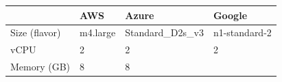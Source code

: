 \begin{tabular}[]{@{}llll@{}}
\toprule
\begin{minipage}[b]{0.13\columnwidth}\raggedright
\strut
\end{minipage} & \begin{minipage}[b]{0.17\columnwidth}\raggedright
AWS\strut
\end{minipage} & \begin{minipage}[b]{0.47\columnwidth}\raggedright
Azure\strut
\end{minipage} & \begin{minipage}[b]{0.12\columnwidth}\raggedright
Google\strut
\end{minipage}\tabularnewline
\midrule
\begin{minipage}[t]{0.13\columnwidth}\raggedright
Size (flavor)\strut
\end{minipage} & \begin{minipage}[t]{0.17\columnwidth}\raggedright
m4.large\strut
\end{minipage} & \begin{minipage}[t]{0.47\columnwidth}\raggedright
Standard\_D2s\_v3\strut
\end{minipage} & \begin{minipage}[t]{0.12\columnwidth}\raggedright
n1-standard-2\strut
\end{minipage}\tabularnewline
\begin{minipage}[t]{0.13\columnwidth}\raggedright
vCPU\strut
\end{minipage} & \begin{minipage}[t]{0.17\columnwidth}\raggedright
2\strut
\end{minipage} & \begin{minipage}[t]{0.47\columnwidth}\raggedright
2\strut
\end{minipage} & \begin{minipage}[t]{0.12\columnwidth}\raggedright
2\strut
\end{minipage}\tabularnewline
\begin{minipage}[t]{0.13\columnwidth}\raggedright
Memory (GB)\strut
\end{minipage} & \begin{minipage}[t]{0.17\columnwidth}\raggedright
8\strut
\end{minipage} & \begin{minipage}[t]{0.47\columnwidth}\raggedright
8\strut
\end{minipage} & \begin{minipage}[t]{0.12\columnwidth}\raggedright

\end{minipage}
\end{tabular}
